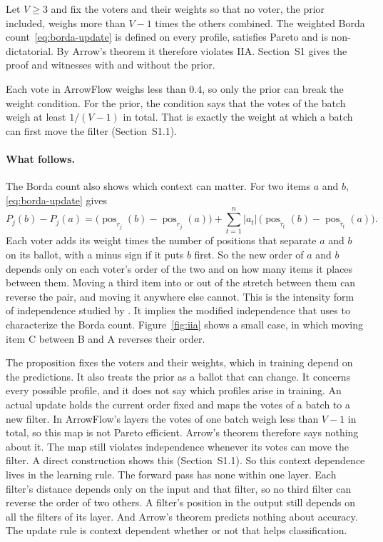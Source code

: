 \begin{proposition}\label{prop:borda-iia}
Let $V\ge3$ and fix the voters and their weights so that no voter, the prior included, weighs more than $V-1$ times the others combined. The weighted Borda count~\eqref{eq:borda-update} is defined on every profile, satisfies Pareto and is non-dictatorial. By Arrow's theorem it therefore violates IIA. Section~S1 gives the proof and witnesses with and without the prior.
\end{proposition}

Each vote in ArrowFlow weighs less than $0.4$, so only the prior can break the weight condition. For the prior, the condition says that the votes of the batch weigh at least $1/(V-1)$ in total. That is exactly the weight at which a batch can first move the filter (Section~S1.1).

\paragraph{What follows.}
The Borda count also shows which context can matter. For two items $a$ and $b$, \eqref{eq:borda-update} gives
\[
P_j(b)-P_j(a)=\bigl(\operatorname{pos}_{r_j}(b)-\operatorname{pos}_{r_j}(a)\bigr)+\sum_{t=1}^{n}|a_t|\,\bigl(\operatorname{pos}_{\tilde\tau_t}(b)-\operatorname{pos}_{\tilde\tau_t}(a)\bigr).
\]
Each voter adds its weight times the number of positions that separate $a$ and $b$ on its ballot, with a minus sign if it puts $b$ first. So the new order of $a$ and $b$ depends only on each voter's order of the two and on how many items it places between them. Moving a third item into or out of the stretch between them can reverse the pair, and moving it anywhere else cannot. This is the intensity form of independence studied by \citet{saari1998connecting}. It implies the modified independence that \citet{maskin2025borda} uses to characterize the Borda count. Figure~\ref{fig:iia} shows a small case, in which moving item C between B and A reverses their order.



The proposition fixes the voters and their weights, which in training depend on the predictions. It also treats the prior as a ballot that can change. It concerns every possible profile, and it does not say which profiles arise in training. An actual update holds the current order fixed and maps the votes of a batch to a new filter. In ArrowFlow's layers the votes of one batch weigh less than $V-1$ in total, so this map is not Pareto efficient. Arrow's theorem therefore says nothing about it. The map still violates independence whenever its votes can move the filter. A direct construction shows this (Section~S1.1). So this context dependence lives in the learning rule. The forward pass has none within one layer. Each filter's distance depends only on the input and that filter, so no third filter can reverse the order of two others. A filter's position in the output still depends on all the filters of its layer. And Arrow's theorem predicts nothing about accuracy. The update rule is context dependent whether or not that helps classification.

